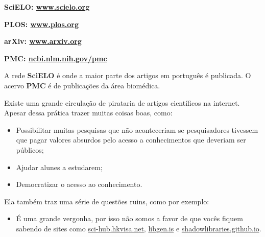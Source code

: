 \textbf{SciELO: \url{www.scielo.org}}

\textbf{PLOS: \url{www.plos.org}}

\textbf{arXiv: \url{www.arxiv.org}}

\textbf{PMC: \url{ncbi.nlm.nih.gov/pmc}}

A rede \textbf{SciELO} é onde a maior parte dos artigos em português é publicada. O acervo  \textbf{PMC} é de publicações da área biomédica.

Existe uma grande circulação de pirataria de artigos científicos na internet. Apesar  dessa prática trazer muitas coisas boas, como:

\begin{itemize}
    \item Possibilitar muitas pesquisas que não aconteceriam se pesquisadores tivessem que  pagar valores absurdos pelo acesso a conhecimentos que deveriam ser públicos;
    \item Ajudar alunes a estudarem;
    \item Democratizar o acesso ao conhecimento.
\end{itemize}

Ela também traz uma série de questões ruins, como por exemplo:

\begin{itemize}
    \item É uma grande vergonha, por isso não somos a favor de que vocês fiquem sabendo de  sites como \url{sci-hub.hkvisa.net}, \url{libgen.is} e \url{shadowlibraries.github.io}.
\end{itemize}